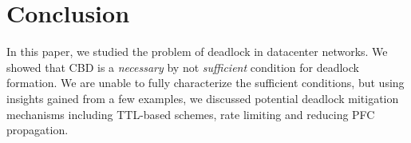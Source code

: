 \secspacelarge
\section{Conclusion}
\secspace

In this paper, we studied the problem of deadlock in datacenter networks.  We
showed that CBD is a {\em necessary} by not {\em
sufficient} condition for deadlock formation. We are unable to fully characterize
the sufficient conditions, but using insights gained from a few examples, we
discussed potential deadlock mitigation mechanisms including TTL-based schemes,
rate limiting and reducing PFC propagation.

